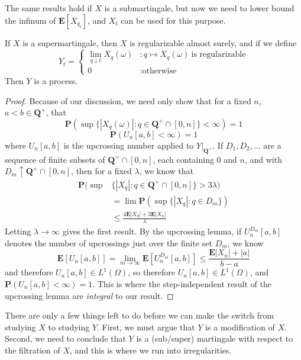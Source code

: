 The same results hold if $X$ is a submartingale, but now we need to lower bound the infinum of $\mathbf{E}[X_{q_i}]$, and $X_t$ can be used for this purpose.

\begin{theorem}
    If $X$ is a supermartingale, then $X$ is regularizable almost surely, and if we define
    \[ Y_t = \begin{cases} \lim_{q \downarrow t} X_q(\omega) & : q \mapsto X_q(\omega)\ \text{is regularizable} \\ 0 & : \text{otherwise} \end{cases} \]
    Then $Y$ is a \cadlag process.
\end{theorem}
\begin{proof}
    Because of our discussion, we need only show that for a fixed $n$, $a < b \in \mathbf{Q}^+$, that
    \[ \mathbf{P}(\sup \{ |X_q(\omega)|: q \in \mathbf{Q}^+ \cap [0,n] \} < \infty) = 1 \]
    \[ \mathbf{P}(U_n[a,b] < \infty) = 1 \]
    where $U_n[a,b]$ is the upcrossing number applied to $Y|_{\mathbf{Q}^+}$. If $D_1, D_2, \dots$ are a sequence of finite subsets of $\mathbf{Q}^+ \cap [0,n]$, each containing $0$ and $n$, and with $D_m \uparrow \mathbf{Q}^+ \cap [0,n]$, then for a fixed $\lambda$, we know that
    \begin{align*}
        \mathbf{P}(\sup & \{ |X_q|: q \in \mathbf{Q}^+ \cap [0,n] \} > 3 \lambda)\\
        &= \lim \mathbf{P}(\sup \{ |X_q|: q \in D_m \})\\
        &\leq \frac{4 \mathbf{E} |X_0| + 3 \mathbf{E} |X_n|}{\lambda}
    \end{align*}
    Letting $\lambda \to \infty$ gives the first result. By the upcrossing lemma, if $U^{D_m}_n[a,b]$ denotes the number of upcrossings just over the finite set $D_m$, we know
    \[ \mathbf{E}[U_n[a,b]] = \lim_{m \to \infty} \mathbf{E}[U^{D_m}_n[a,b]] \leq \frac{\mathbf{E} |X_n| + |a|}{b-a} \]
    and therefore $U_n[a,b] \in L^1(\Omega)$, so therefore $U_n[a,b] \in L^1(\Omega)$, and $\mathbf{P}(U_n[a,b] < \infty) = 1$. This is where the step-independent result of the upcrossing lemma are {\it integral} to our result.
\end{proof}

There are only a few things left to do before we can make the switch from studying $X$ to studying $Y$. First, we must argue that $Y$ is a modification of $X$. Second, we need to conclude that $Y$ is a (sub/super) martingale with respect to the filtration of $X$, and this is where we run into irregularities.

